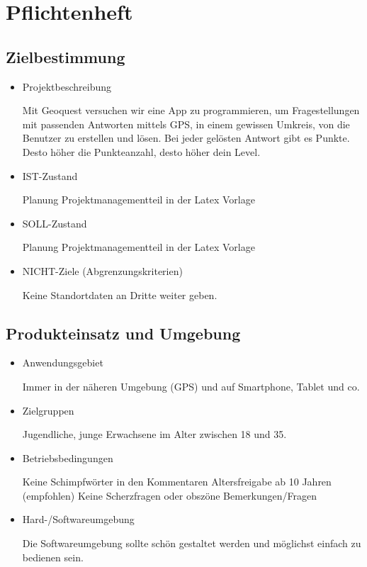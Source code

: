 \section{Pflichtenheft}
\subsection{Zielbestimmung}
\begin{itemize}
	\item Projektbeschreibung
	
	Mit Geoquest versuchen wir eine App zu programmieren, um Fragestellungen mit passenden Antworten
	mittels GPS, in einem gewissen Umkreis, von die Benutzer zu erstellen und lösen. Bei jeder gelösten
	Antwort gibt es Punkte. Desto höher die Punkteanzahl, desto höher dein Level.
	
	\item IST-Zustand
	
	Planung Projektmanagementteil in der Latex Vorlage
	
	\item SOLL-Zustand
	
    Planung Projektmanagementteil in der Latex Vorlage
    	
	\item NICHT-Ziele (Abgrenzungskriterien)	

	Keine Standortdaten an Dritte weiter geben.
	
\end{itemize}
\subsection{Produkteinsatz und Umgebung}
\begin{itemize}
	\item Anwendungsgebiet
	
	Immer in der näheren Umgebung (GPS) und auf Smartphone, Tablet und co.
	
	\item Zielgruppen
	
	Jugendliche, junge Erwachsene im Alter zwischen 18 und 35.
	
	\item Betriebsbedingungen
	
	Keine Schimpfwörter in den Kommentaren
	Altersfreigabe ab 10 Jahren (empfohlen)
	Keine Scherzfragen oder obszöne Bemerkungen/Fragen
	
	\item Hard-/Softwareumgebung
	
	Die Softwareumgebung sollte schön gestaltet werden und möglichst einfach zu bedienen sein.
	
\end{itemize}
